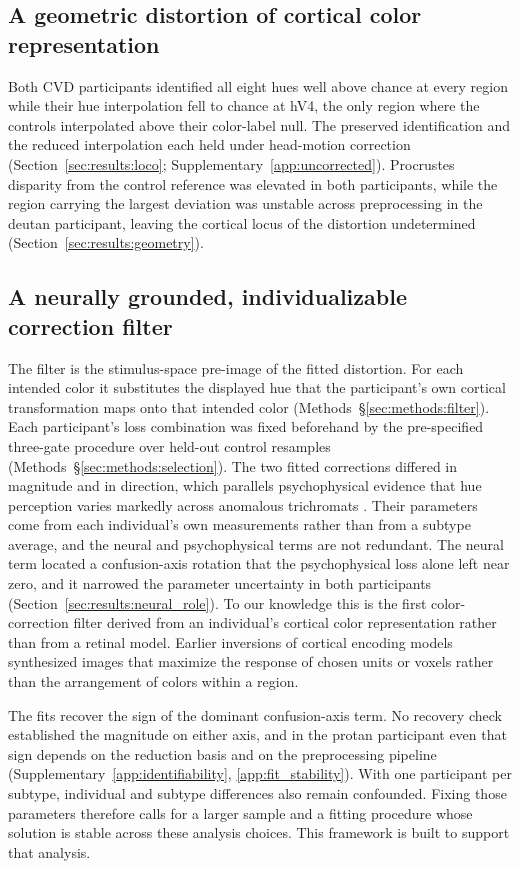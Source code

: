 \subsection{A geometric distortion of cortical color representation}
Both CVD participants identified all eight hues well above chance at every region while their hue interpolation fell to chance at hV4, the only region where the controls interpolated above their color-label null. The preserved identification and the reduced interpolation each held under head-motion correction (Section~\ref{sec:results:loco}; Supplementary~\cref{app:uncorrected}). Procrustes disparity from the control reference was elevated in both participants, while the region carrying the largest deviation was unstable across preprocessing in the deutan participant, leaving the cortical locus of the distortion undetermined (Section~\ref{sec:results:geometry}).

\subsection{A neurally grounded, individualizable correction filter}
The filter is the stimulus-space pre-image of the fitted distortion. For each intended color it substitutes the displayed hue that the participant's own cortical transformation maps onto that intended color (Methods~\S\ref{sec:methods:filter}). Each participant's loss combination was fixed beforehand by the pre-specified three-gate procedure over held-out control resamples (Methods~\S\ref{sec:methods:selection}). The two fitted corrections differed in magnitude and in direction, which parallels psychophysical evidence that hue perception varies markedly across anomalous trichromats \parencite{emery2021}. Their parameters come from each individual's own measurements rather than from a subtype average, and the neural and psychophysical terms are not redundant. The neural term located a confusion-axis rotation that the psychophysical loss alone left near zero, and it narrowed the parameter uncertainty in both participants (Section~\ref{sec:results:neural_role}). To our knowledge this is the first color-correction filter derived from an individual's cortical color representation rather than from a retinal model. Earlier inversions of cortical encoding models synthesized images that maximize the response of chosen units \parencite{bashivan2019} or voxels \parencite{shinkle2025} rather than the arrangement of colors within a region.

The fits recover the sign of the dominant confusion-axis term. No recovery check established the magnitude on either axis, and in the protan participant even that sign depends on the reduction basis and on the preprocessing pipeline (Supplementary~\cref{app:identifiability}, \cref{app:fit_stability}). With one participant per subtype, individual and subtype differences also remain confounded. Fixing those parameters therefore calls for a larger sample and a fitting procedure whose solution is stable across these analysis choices. This framework is built to support that analysis.


